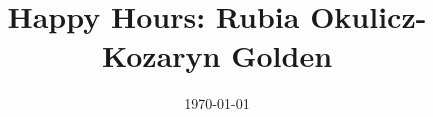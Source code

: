\documentclass[10pt, letterpaper]{article}
\date{{}\today  \hspace{.2in}\xxivtime}
\title{  %
Happy Hours: Rubia Okulicz-Kozaryn Golden
}
\author{
}
\begin{document}


\maketitle
\vspace{-.4in}
\begin{center}

\end{center}


\begin{abstract}
\end{abstract}
\vspace{.15in} 
\noindent{\sc %
}
\vspace{.25in} 
\end{document}
